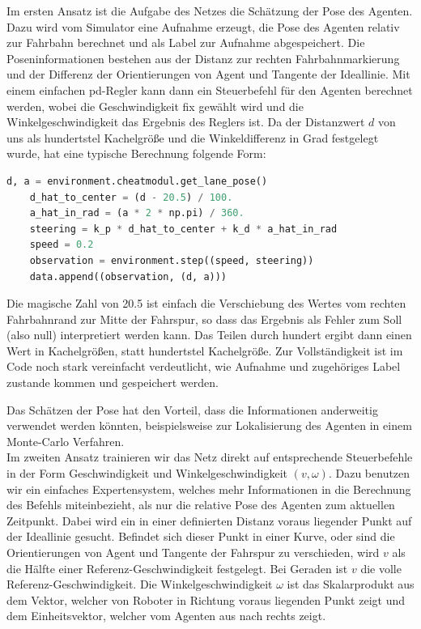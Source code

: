 Im ersten Ansatz ist die Aufgabe des Netzes die Schätzung der Pose des Agenten. Dazu wird vom Simulator eine Aufnahme erzeugt, die Pose des Agenten relativ zur Fahrbahn berechnet und als Label zur Aufnahme abgespeichert. Die Poseninformationen bestehen aus der Distanz zur rechten Fahrbahnmarkierung und der Differenz der Orientierungen von Agent und Tangente der Ideallinie. Mit einem einfachen \acs{pd}-Regler kann dann ein Steuerbefehl für den Agenten berechnet werden, wobei die Geschwindigkeit fix gewählt wird und die Winkelgeschwindigkeit das Ergebnis des Reglers ist. Da der Distanzwert $d$ von uns als hundertstel Kachelgröße und die Winkeldifferenz in Grad festgelegt wurde, hat eine typische Berechnung folgende Form:\\

\begin{minipage}{\linewidth}
	\begin{lstlisting}[caption={Berechnung eines Steuerbefehls mit \acs{pd}-Regler}, language=python]
	d, a = environment.cheatmodul.get_lane_pose()
	d_hat_to_center = (d - 20.5) / 100.
	a_hat_in_rad = (a * 2 * np.pi) / 360.
	steering = k_p * d_hat_to_center + k_d * a_hat_in_rad
	speed = 0.2
	observation = environment.step((speed, steering))
	data.append((observation, (d, a)))
	\end{lstlisting}
\end{minipage}

\vspace{.5cm}
Die magische Zahl von 20.5 ist einfach die Verschiebung des Wertes vom rechten Fahrbahnrand zur Mitte der Fahrspur, so dass das Ergebnis als Fehler zum Soll (also null) interpretiert werden kann. Das Teilen durch hundert ergibt dann einen Wert in Kachelgrößen, statt hundertstel Kachelgröße.
Zur Vollständigkeit ist im Code noch stark vereinfacht verdeutlicht, wie Aufnahme und zugehöriges Label zustande kommen und gespeichert werden.

Das Schätzen der Pose hat den Vorteil, dass die Informationen anderweitig verwendet werden könnten, beispielsweise zur Lokalisierung des Agenten in einem Monte-Carlo Verfahren.\\

Im zweiten Ansatz trainieren wir das Netz direkt auf entsprechende Steuerbefehle in der Form Geschwindigkeit und Winkelgeschwindigkeit $(v, \omega)$. Dazu benutzen wir ein einfaches Expertensystem, welches mehr Informationen in die Berechnung des Befehls miteinbezieht, als nur die relative Pose des Agenten zum aktuellen Zeitpunkt. Dabei wird ein in einer definierten Distanz voraus liegender Punkt auf der Ideallinie gesucht. Befindet sich dieser Punkt in einer Kurve, oder sind die Orientierungen von Agent und Tangente der Fahrspur zu verschieden, wird $v$ als die Hälfte einer Referenz-Geschwindigkeit festgelegt. Bei Geraden ist $v$ die volle Referenz-Geschwindigkeit. Die Winkelgeschwindigkeit $\omega$ ist das Skalarprodukt aus dem Vektor, welcher von Roboter in Richtung voraus liegenden Punkt zeigt und dem Einheitsvektor, welcher vom Agenten aus nach rechts zeigt.

